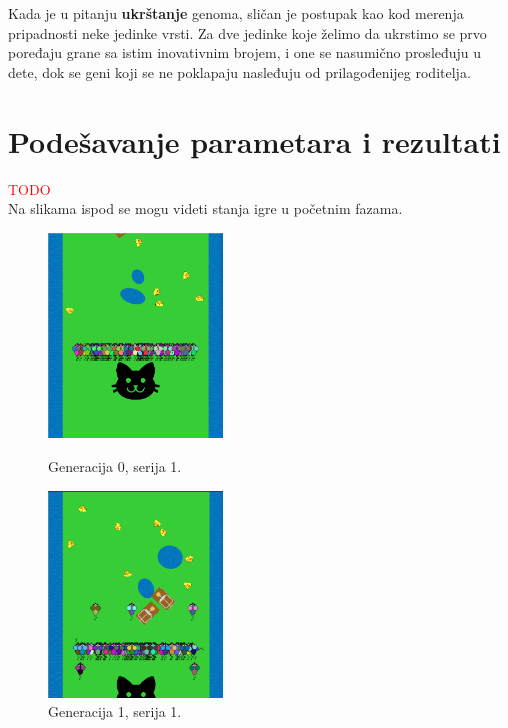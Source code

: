 \documentclass[a4paper]{article}
\begin{document}
Kada je u pitanju \textbf{ukrštanje} genoma, sličan je postupak kao kod merenja pripadnosti neke jedinke vrsti. Za dve jedinke koje želimo da ukrstimo se prvo poređaju grane sa istim inovativnim brojem, i one se nasumično prosleđuju u dete, dok se geni koji se ne poklapaju nasleđuju od prilagođenijeg roditelja.

\section{Podešavanje parametara i rezultati}
\label{podesavanje}

\textcolor{red}{TODO} \\
Na slikama ispod se mogu videti stanja igre u početnim fazama.

\begin{figure}[!h]
  \centering
  \begin{minipage}[b]{0.4\textwidth}
    \includegraphics[width=175px]{gen0_batch1.png}
    \caption{Generacija 0, serija 1.}
    \label{fig:gen0batch1}
  \end{minipage}
  \hfill
  \begin{minipage}[b]{0.4\textwidth}
    \includegraphics[width=175px]{gen1_batch1.png}
    \caption{Generacija 1, serija 1.}
    \label{fig:gen1batch1}
  \end{minipage}
\end{figure}
\end{document}
